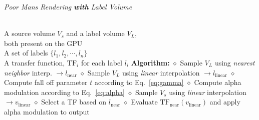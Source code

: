 \documentclass{egpubl}
\begin{document}
\def\myitem{\diamond}


\begin{algorithm}[t]
\caption{\label{code:recon} \emph{Poor Mans Rendering \textbf{with} Label Volume}}
\begin{algorithmic}
\REQUIRE \quad\\
A source volume $V_s$ and a label volume $V_L$,\\both present on the GPU\\
A set of labels $\{ l_1, l_2, \cdots, l_n \}$ \\
A transfer function, $\mathrm{TF}_i$ for each label $l_i$ 
\STATE \hspace{-3mm}\textbf{Algorithm:}
 \nonumber
\STATE $\myitem$ Sample $V_L$ using \emph{nearest neighbor} interp. $\rightarrow l_\mathrm{near}$
\STATE $\myitem$ Sample $V_L$ using \emph{linear} interpolation $\rightarrow l_\mathrm{linear}$
\STATE $\myitem$ Compute fall off parameter $t$ according to Eq.~\ref{eq:gamma}
\STATE $\myitem$ Compute alpha modulation according to Eq.~\ref{eq:alpha}
\STATE $\myitem$ Sample $V_s$ using \emph{linear} interpolation $\rightarrow v_\mathrm{linear}$ 
\STATE $\myitem$ Select a TF based on $l_\mathrm{near}$
\STATE $\myitem$ Evaluate $\mathrm{TF}_\mathrm{near}(v_\mathrm{linear})$ and apply alpha modulation to output
\ENDFOR
\end{algorithmic}
\end{algorithm}
\end{document}

